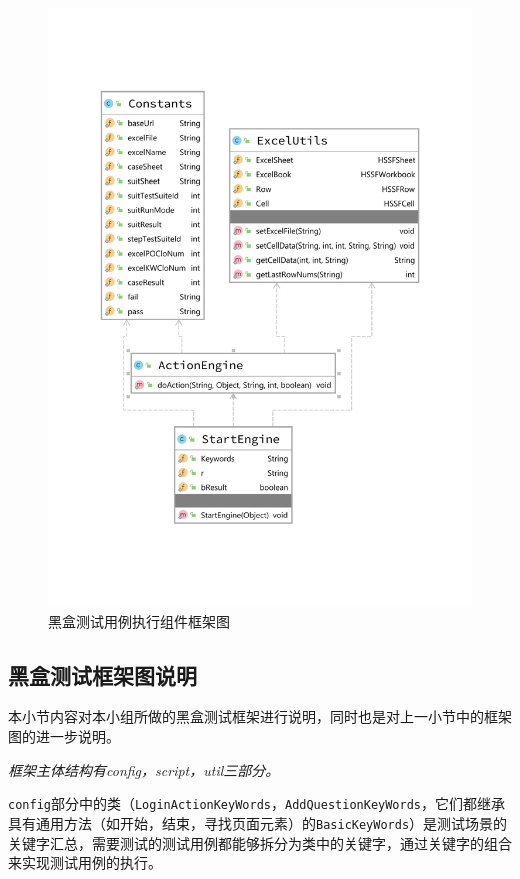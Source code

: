 \documentclass[hyperref, a4paper]{ctexart}
\begin{document}
\begin{figure}
  \centering
  \includegraphics[scale=0.85]{./ActionEngineDiagram.pdf}
  \caption{黑盒测试用例执行组件框架图}\label{4}
\end{figure}

\pagebreak

\hypertarget{ux9ed1ux76d2ux6d4bux8bd5ux6846ux67b6ux56feux8bf4ux660e}{%
\subsection{黑盒测试框架图说明}\label{ux9ed1ux76d2ux6d4bux8bd5ux6846ux67b6ux56feux8bf4ux660e}}

本小节内容对本小组所做的黑盒测试框架进行说明，同时也是对上一小节中的框架图的进一步说明。

\emph{框架主体结构有config，script，util三部分。}

\texttt{config}部分中的类（\texttt{LoginActionKeyWords}，\texttt{AddQuestionKeyWords}，它们都继承具有通用方法（如开始，结束，寻找页面元素）的\texttt{BasicKeyWords}）是测试场景的关键字汇总，需要测试的测试用例都能够拆分为类中的关键字，通过关键字的组合来实现测试用例的执行。
\end{document}
